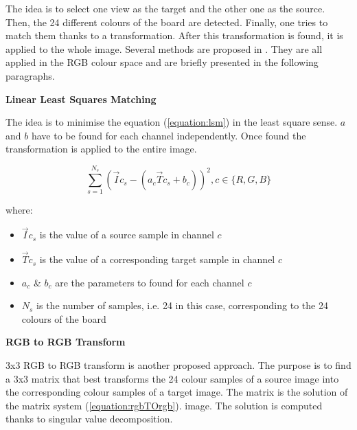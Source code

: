 The idea is to select one view as the target and the other one as the source. Then, the 24 different colours of the board are detected. Finally, one tries to match them thanks to a transformation. After this transformation is found, it is applied to the whole image. Several methods are proposed in \cite{ilie_ensuring_2005}. They are all applied in the RGB colour space and are briefly presented in the following paragraphs.

\textbf{Linear Least Squares Matching}

The idea is to minimise the equation (\ref{equation:lsm}) in the least square sense. $a$ and $b$ have to be found for each channel independently. Once found the transformation is applied to the entire image. 

\begin{equation}
\sum_{s=1}^{N_s}\left(\vec{I} {c}_{s}-\left(a_{c} \vec{T} {c}_{s}+b_{c}\right)\right)^{2}, c \in\{R, G, B\}
\label{equation:lsm}
\end{equation}

where:

\begin{itemize}
    \item $\vec{I} {c}_{s}$ is the value of a source sample in channel $c$
    \item $\vec{T} {c}_{s}$ is the value of a corresponding target sample in channel $c$
    \item $a_{c}$ \& $b_{c}$ are the parameters to found for each channel $c$
    \item $N_s$ is the number of samples, i.e. 24 in this case, corresponding to the 24 colours of the board
\end{itemize}


\textbf{RGB to RGB Transform}

3x3 RGB to RGB transform is another proposed approach. The purpose is to find a 3x3 matrix that best transforms the 24 colour samples of a source image into the corresponding colour samples of a target image. The matrix is the solution of the matrix system (\ref{equation:rgbTOrgb}). image. The solution is computed thanks to singular value decomposition.

